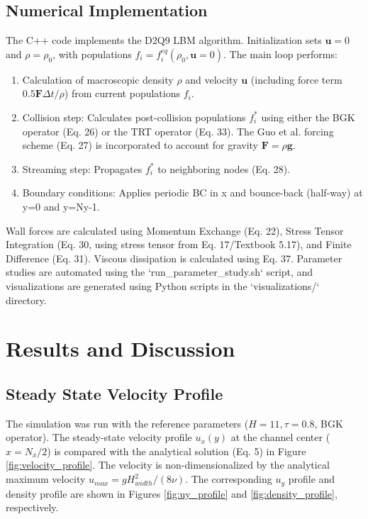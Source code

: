 \documentclass[11pt, a4paper]{article}
\begin{document}
\subsection{Numerical Implementation}
The C++ code implements the D2Q9 LBM algorithm. Initialization sets $\mathbf{u}=0$ and $\rho=\rho_0$, with populations $f_i = f_i^{eq}(\rho_0, \mathbf{u}=0)$. The main loop performs:
\begin{enumerate}
    \item Calculation of macroscopic density $\rho$ and velocity $\mathbf{u}$ (including force term $0.5 \mathbf{F} \Delta t / \rho$) from current populations $f_i$.
    \item Collision step: Calculates post-collision populations $f_i^*$ using either the BGK operator (Eq. 26) or the TRT operator (Eq. 33). The Guo et al. forcing scheme (Eq. 27) is incorporated to account for gravity $\mathbf{F} = \rho \mathbf{g}$.
    \item Streaming step: Propagates $f_i^*$ to neighboring nodes (Eq. 28).
    \item Boundary conditions: Applies periodic BC in x and bounce-back (half-way) at y=0 and y=Ny-1.
\end{enumerate}
Wall forces are calculated using Momentum Exchange (Eq. 22), Stress Tensor Integration (Eq. 30, using stress tensor from Eq. 17/Textbook 5.17), and Finite Difference (Eq. 31). Viscous dissipation is calculated using Eq. 37. Parameter studies are automated using the `run_parameter_study.sh` script, and visualizations are generated using Python scripts in the `visualizations/` directory.

\section{Results and Discussion}

\subsection{Steady State Velocity Profile}
The simulation was run with the reference parameters ($H=11, \tau=0.8$, BGK operator). The steady-state velocity profile $u_x(y)$ at the channel center ($x=N_x/2$) is compared with the analytical solution (Eq. 5) in Figure \ref{fig:velocity_profile}. The velocity is non-dimensionalized by the analytical maximum velocity $u_{max} = g H_{width}^2 / (8\nu)$. The corresponding $u_y$ profile and density profile are shown in Figures \ref{fig:uy_profile} and \ref{fig:density_profile}, respectively.
\end{document}
